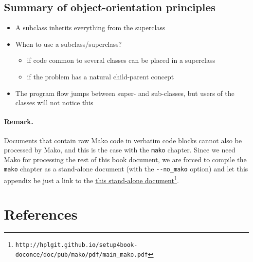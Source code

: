 \documentclass[graybox,envcountchap,sectrefs,final]{svmonodo}
\newenvironment{block_mdfboxadmon}[1][]{
\begin{block_mdfboxmdframed}[frametitle=#1]
}
{
\end{block_mdfboxmdframed}
}
\begin{document}
\subsection{Summary of object-orientation principles}


\begin{block_mdfboxadmon}[]
\begin{itemize}
  \item A subclass inherits everything from the superclass

  \item When to use a subclass/superclass?
\begin{itemize}

    \item if code common to several classes can be placed in a superclass

    \item if the problem has a natural child-parent concept

\end{itemize}

\noindent
  \item The program flow jumps between super- and sub-classes, but users of the classes will not
    notice this
\end{itemize}

\noindent
\end{block_mdfboxadmon} %




\paragraph{Remark.}
Documents that contain raw Mako code in verbatim code blocks cannot
also be processed by Mako, and this is the case with the \texttt{mako}
chapter. Since we need Mako for processing the rest of this book
document, we are forced to compile the \texttt{mako} chapter as a stand-alone
document (with the \Verb!--no_mako! option) and let this appendix be just a
link to the \href{{http://hplgit.github.io/setup4book-doconce/doc/pub/mako/pdf/main_mako.pdf}}{this stand-alone document}\footnote{\texttt{http://hplgit.github.io/setup4book-doconce/doc/pub/mako/pdf/main\_mako.pdf}}.


\section{References}



\backmatter

\end{document}
